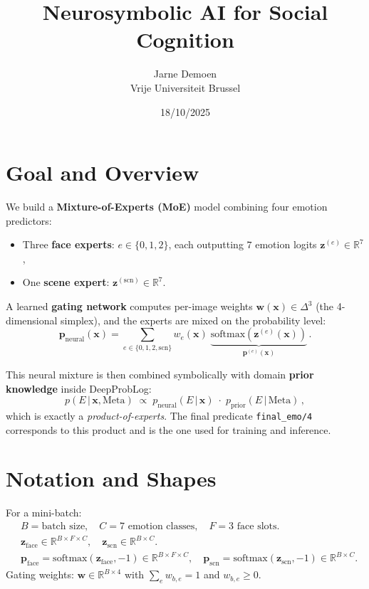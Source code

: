 \documentclass[12pt]{article}
\title{Neurosymbolic AI for Social Cognition}
\author{Jarne Demoen\\
Vrije Universiteit Brussel}
\date{18/10/2025}
\begin{document}
\maketitle

\section{Goal and Overview}

We build a \textbf{Mixture-of-Experts (MoE)} model combining four emotion predictors:
\begin{itemize}[leftmargin=1.2em]
  \item Three \textbf{face experts}: $e\in\{0,1,2\}$, each outputting $7$ emotion logits $\bm{z}^{(e)}\in\mathbb{R}^{7}$,
  \item One \textbf{scene expert}: $\bm{z}^{(\text{scn})}\in\mathbb{R}^{7}$.
\end{itemize}

A learned \textbf{gating network} computes per-image weights $\bm{w}(\bm{x})\in\Delta^{3}$ (the 4-dimensional simplex), and the experts are mixed on the probability level:
\[
\bm{p}_{\text{neural}}(\bm{x})
= \sum_{e\in\{0,1,2,\text{scn}\}} w_e(\bm{x})\;\underbrace{\mathrm{softmax}\!\left(\bm{z}^{(e)}(\bm{x})\right)}_{\bm{p}^{(e)}(\bm{x})}\,.
\]

This neural mixture is then combined symbolically with domain \textbf{prior knowledge} inside DeepProbLog:
\[
p(E\,|\,\bm{x},\text{Meta})
\;\propto\;
p_{\text{neural}}(E\,|\,\bm{x})\;\cdot\;p_{\text{prior}}(E\,|\,\text{Meta})\,,
\]
which is exactly a \emph{product-of-experts}. The final predicate \texttt{final\_emo/4} corresponds to this product and is the one used for training and inference.

\section{Notation and Shapes}
For a mini-batch:
\[
\begin{aligned}
&B = \text{batch size}, \quad C = 7 \text{ emotion classes}, \quad F=3 \text{ face slots.}\\
&\bm{z}_{\text{face}} \in \mathbb{R}^{B\times F\times C},\quad
\bm{z}_{\text{scn}} \in \mathbb{R}^{B\times C}.\\
&\bm{p}_{\text{face}}=\mathrm{softmax}(\bm{z}_{\text{face}},-1)\in\mathbb{R}^{B\times F\times C},\quad
\bm{p}_{\text{scn}}=\mathrm{softmax}(\bm{z}_{\text{scn}},-1)\in\mathbb{R}^{B\times C}.
\end{aligned}
\]
Gating weights: $\bm{w}\in\mathbb{R}^{B\times 4}$ with $\sum_{e} w_{b,e}=1$ and $w_{b,e}\ge 0$.
\end{document}
